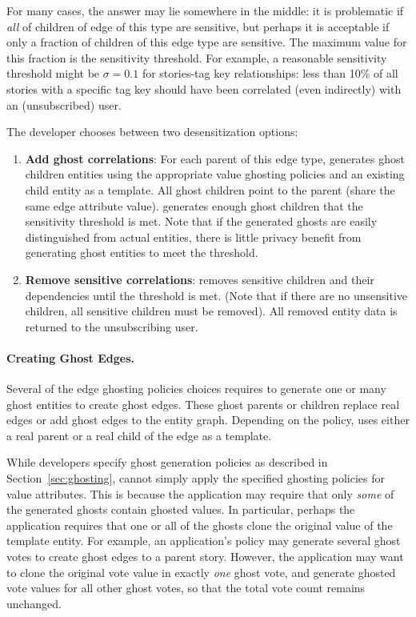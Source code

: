 For many cases, the answer may lie somewhere in the middle: it is problematic if \emph{all} of
children of edge of this type are sensitive, but perhaps it is acceptable if only a fraction of
children of this edge type are sensitive. The maximum value for this fraction is the sensitivity
threshold.  For example, a reasonable sensitivity threshold might be $\sigma = 0.1$ for stories-tag
key relationships: less than 10\% of all stories with a specific tag key should have been correlated
(even indirectly) with an (unsubscribed) user. 

The developer chooses between two desensitization options:
\begin{enumerate} 
    \item \textbf{Add ghost correlations}: For each parent of this edge type, \sys
            generates ghost children entities using the appropriate value ghosting policies and an
            existing child entity as a template. All ghost children point to the parent (share the
            same edge attribute value).  \sys generates enough ghost children that the sensitivity
            threshold is met.  Note that if the generated ghosts are easily distinguished from
            actual entities, there is little privacy benefit from generating ghost entities to meet
            the threshold.

\item \textbf{Remove sensitive correlations}: \sys removes sensitive children and their dependencies
    until the threshold is met. (Note that if there are no unsensitive children, all sensitive
    children must be removed). All removed entity data is returned to the unsubscribing user.
\end{enumerate}

\paragraph{Creating Ghost Edges.}
Several of the edge ghosting policies choices requires \sys to generate one or many ghost entities
to create ghost edges. These ghost parents or children replace real edges or add ghost edges to the
entity graph.  Depending on the policy, \sys uses either a real parent or a real child of the
edge as a template. 

While developers specify ghost generation policies as described in Section~\ref{sec:ghosting}, \sys
cannot simply apply the specified ghosting policies for value attributes.  This is because the
application may require that only \emph{some} of the generated ghosts contain ghosted values. In
particular, perhaps the application requires that one or all of the ghosts clone the original value
of the template entity. For example, an application's policy may generate several ghost votes to
create ghost edges to a parent story. However, the application may want to clone the original vote
value in exactly \emph{one} ghost vote, and generate ghosted vote values for all other ghost votes,
so that the total vote count remains unchanged. 

